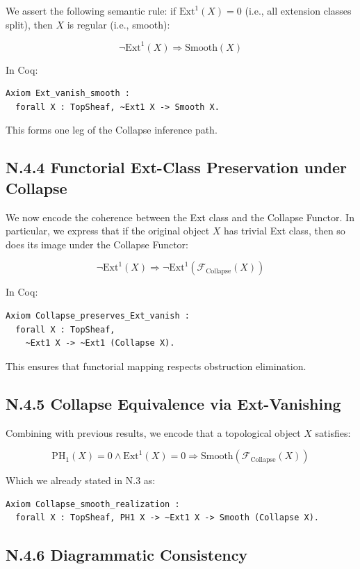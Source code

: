 \documentclass[11pt]{article}
\begin{document}
We assert the following semantic rule:  
if $\mathrm{Ext}^1(X) = 0$ (i.e., all extension classes split), then $X$ is regular (i.e., smooth):

\[
\neg \mathrm{Ext}^1(X) \Rightarrow \mathrm{Smooth}(X)
\]

In Coq:

\begin{verbatim}
Axiom Ext_vanish_smooth :
  forall X : TopSheaf, ~Ext1 X -> Smooth X.
\end{verbatim}

This forms one leg of the Collapse inference path.

\subsection*{N.4.4 Functorial Ext-Class Preservation under Collapse}

We now encode the coherence between the Ext class and the Collapse Functor.  
In particular, we express that if the original object $X$ has trivial Ext class, then so does its image under the Collapse Functor:

\[
\neg \mathrm{Ext}^1(X) \Rightarrow \neg \mathrm{Ext}^1(\mathcal{F}_{\mathrm{Collapse}}(X))
\]

In Coq:

\begin{verbatim}
Axiom Collapse_preserves_Ext_vanish :
  forall X : TopSheaf,
    ~Ext1 X -> ~Ext1 (Collapse X).
\end{verbatim}

This ensures that functorial mapping respects obstruction elimination.

\subsection*{N.4.5 Collapse Equivalence via Ext-Vanishing}

Combining with previous results, we encode that a topological object $X$ satisfies:

\[
\mathrm{PH}_1(X) = 0 \wedge \mathrm{Ext}^1(X) = 0 \Rightarrow \mathrm{Smooth}(\mathcal{F}_{\mathrm{Collapse}}(X))
\]

Which we already stated in N.3 as:

\begin{verbatim}
Axiom Collapse_smooth_realization :
  forall X : TopSheaf, PH1 X -> ~Ext1 X -> Smooth (Collapse X).
\end{verbatim}

\subsection*{N.4.6 Diagrammatic Consistency}
\end{document}

